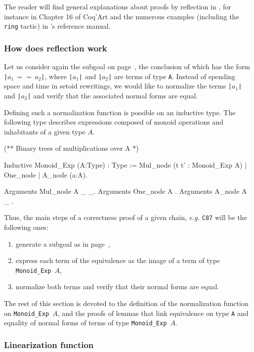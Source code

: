 The reader will find general explanations about proofs by reflection in \coq{},
for instance in Chapter 16 of Coq'Art\cite{BC04} and the numerous examples (including the \texttt{ring} tactic) 
in \coq's reference manual.


\subsubsection{How does reflection work}
Let us consider again the subgoal on page~\pageref{fig:big-goal}, the conclusion of which has the form \texttt{|$a_1\,==\,a_2$|}, where \texttt{|$a_1$|} and
\texttt{|$a_2$|} are terms of  type \texttt{A}.
Instead of spending space and time in setoid rewritings, we would like to
normalize the terms \texttt{|$a_1$|} and \texttt{|$a_2$|} and verify that 
the associated normal forms are equal.

Defining such a normalization function is possible on an inductive type.
The following type describes expressions composed of monoid operations and inhabitants of a given type $A$.

\begin{Coqsrc}
(** Binary trees of multiplications over A *)

Inductive Monoid_Exp (A:Type) : Type :=
 Mul_node (t t' : Monoid_Exp A) | One_node | A_node (a:A).

Arguments Mul_node {A} _ _.
Arguments One_node {A} .
Arguments A_node {A} _ .
\end{Coqsrc}




Thus, the main steps of a correctness proof of a given chain, \emph{e.g.}
\texttt{C87} will be the following ones:
\begin{enumerate}
\item generate a subgoal as in page~\pageref{fig:big-goal},
\item express each term of the equivalence as the image of a term
     of type \texttt{Monoid\_Exp $A$},
\item normalize both terms and verify that their normal forms are equal.
\end{enumerate}

The rest of this section is devoted to the definition of the normalization 
function on \texttt{Monoid\_Exp $A$}, and the proofs of lemmas that
link equivalence on type \texttt{A} and equality of normal forms
of terms of type \texttt{Monoid\_Exp $A$}.


\subsubsection{Linearization function}

